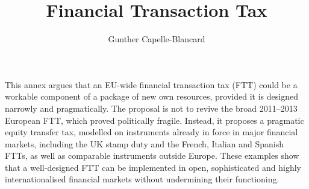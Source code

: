\documentclass[../../main]{subfiles}
\begin{document}
\title{Financial Transaction Tax}
\author{Gunther Capelle-Blancard}
\date{}
\maketitle

This annex argues that an EU-wide financial transaction tax (FTT) could be a workable component of a package of new own resources, provided it is designed narrowly and pragmatically. The proposal is not to revive the broad 2011--2013 European FTT, which proved politically fragile. Instead, it proposes a pragmatic equity transfer tax, modelled on instruments already in force in major financial markets, including the UK stamp duty and the French, Italian and Spanish FTTs, as well as comparable instruments outside Europe. These examples show that a well-designed FTT can be implemented in open, sophisticated and highly internationalised financial markets without undermining their functioning.




\end{document}
